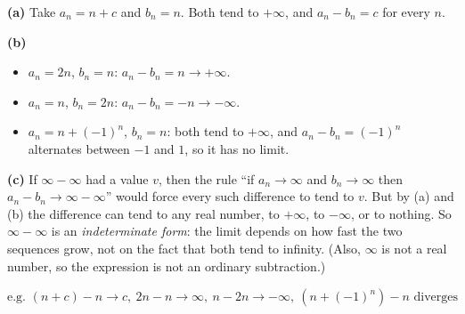 \textbf{(a)} Take $a_n=n+c$ and $b_n=n$. Both tend to $+\infty$, and $a_n-b_n=c$ for every $n$.

\textbf{(b)}
\begin{itemize}
\item $a_n=2n$, $b_n=n$: $a_n-b_n=n\to+\infty$.
\item $a_n=n$, $b_n=2n$: $a_n-b_n=-n\to-\infty$.
\item $a_n=n+(-1)^n$, $b_n=n$: both tend to $+\infty$, and $a_n-b_n=(-1)^n$ alternates between $-1$ and $1$, so it has no limit.
\end{itemize}

\textbf{(c)} If $\infty-\infty$ had a value $v$, then the rule ``if $a_n\to\infty$ and $b_n\to\infty$ then $a_n-b_n\to\infty-\infty$'' would force every such difference to tend to $v$. But by (a) and (b) the difference can tend to any real number, to $+\infty$, to $-\infty$, or to nothing. So $\infty-\infty$ is an \emph{indeterminate form}: the limit depends on how fast the two sequences grow, not on the fact that both tend to infinity. (Also, $\infty$ is not a real number, so the expression is not an ordinary subtraction.)

$\boxed{\text{e.g. }(n+c)-n\to c,\ 2n-n\to\infty,\ n-2n\to-\infty,\ (n+(-1)^n)-n\text{ diverges}}$
